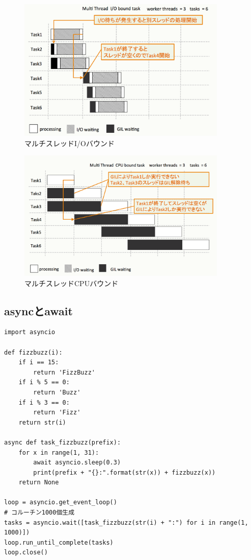 \documentclass[14pt, oneside]{article}     	%
\begin{document}
\begin{figure}[H]
  \centering
  \includegraphics[width=10cm]{multithred_iobound.png}
  \caption{マルチスレッドI/Oバウンド}
  \label{multithred_iobound}
\end{figure}

\begin{figure}[H]
  \centering
  \includegraphics[width=10cm]{multithred_cpubound.png}
  \caption{マルチスレッドCPUバウンド}
  \label{multithred_cpubound}
\end{figure}




\subsection{asyncとawait}

\begin{lstlisting}[caption=FizzBuzz using async-await]
import asyncio

def fizzbuzz(i):
    if i == 15:
        return 'FizzBuzz'
    if i % 5 == 0:
        return 'Buzz'
    if i % 3 == 0:
        return 'Fizz'
    return str(i)

async def task_fizzbuzz(prefix):
    for x in range(1, 31):
        await asyncio.sleep(0.3)
        print(prefix + "{}:".format(str(x)) + fizzbuzz(x))
    return None

loop = asyncio.get_event_loop()
# コルーチン1000個生成
tasks = asyncio.wait([task_fizzbuzz(str(i) + ":") for i in range(1, 1000)])
loop.run_until_complete(tasks)
loop.close()

\end{lstlisting}
\end{document}
